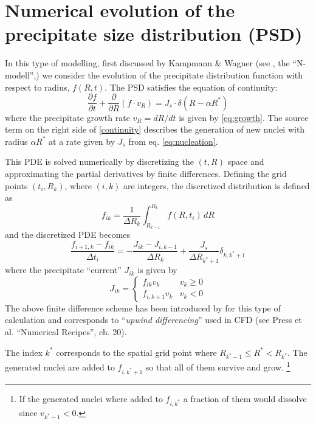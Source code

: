 \documentclass[12pt,a4paper]{article}
\begin{document}
\pagebreak

\section{Numerical evolution of the precipitate size distribution (PSD)}

In this type of modelling, first discussed by Kampmann \& Wagner (see \citet{Wagner-2005-HomogeneousSecond-P}, the ``N-modell'',) we consider the evolution of the precipitate distribution function with respect to radius, $f(R,t)$. The PSD satisfies the equation of continuity:
\begin{equation}
\label{continuity}
\frac{\partial f}{\partial t} + \frac{\partial }{\partial R} (f \cdot v_R) = J_s \cdot \delta(R - \alpha R^*)
\end{equation}
where the precipitate growth rate $v_R = dR/dt$ is given by \eqref{eq:growth}. The source term on the right side of \eqref{continuity} describes the generation of new nuclei with radius $\alpha R^*$ at a rate given by $J_s$ from eq. \eqref{eq:nucleation}.

This PDE is solved numerically by discretizing the $(t,R)$ space and approximating the partial derivatives by finite differences. Defining the grid points $(t_i, R_k)$, where $(i,k)$ are integers, the discretized distribution is defined as
\begin{equation}
f_{ik} = \frac{1}{\Delta R_k} \int_{R_{k-1}}^{R_k}f(R,t_i)\,dR
\end{equation}
and the discretized PDE becomes
\begin{equation}
\label{PDE}
\frac{f_{i+1,k} - f_{ik}}{\Delta t_i} = - \frac{J_{ik} - J_{i,k-1}}{\Delta R_k} + \frac{J_s}{\Delta R_{k^*+1}} \delta_{k,k^*+1}
\end{equation}
where the precipitate ``current'' $J_{ik}$ is given by
\begin{equation} 
J_{ik} = 
\begin{cases}
f_{ik}v_k & v_k \geq 0 \\
f_{i,k+1}v_k & v_k<0
\end{cases}
\end{equation}
The above finite difference scheme has been introduced by \citet{Myhr-2000-Modellingofnon-iso} for this type of calculation and corresponds to ``\textit{upwind differencing}'' used in CFD (see Press et al. ``Numerical Recipes'', ch. 20).

The index $k^*$ corresponds to the spatial grid point where $R_{k^*-1} \leq  R^* < R_{k^*}$. The generated nuclei are added to $f_{i,k^*+1}$ so that all of them survive and grow. \footnote{If the generated nuclei where added to $f_{i,k^*}$ a fraction of them would dissolve since $v_{k^*-1}<0.$ }
\end{document}

